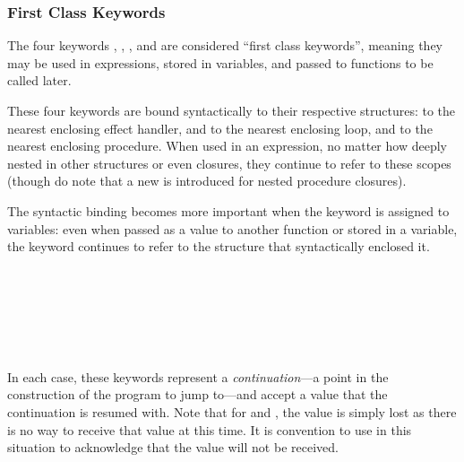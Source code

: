 \subsubsection{First Class Keywords}
\label{sec:first-class-keyword}

The four keywords , , , and  are
considered ``first class keywords'', meaning they may be used in expressions,
stored in variables, and passed to functions to be called later.

These four keywords are bound syntactically to their respective structures:
 to the nearest enclosing effect handler,  and 
to the nearest enclosing loop, and  to the nearest enclosing procedure.
When used in an expression, no matter how deeply nested in other structures or even
closures, they continue to refer to these scopes (though do note that a new 
is introduced for nested procedure closures).

The syntactic binding becomes more important when the keyword is assigned to variables:
even when passed as a value to another function or stored in a variable, the keyword
continues to refer to the structure that syntactically enclosed it.

\begin{bnf*}
     \\
     \\
     \\
     \\
     \\
\end{bnf*}

In each case, these keywords represent a \emph{continuation}---a point in the
construction of the program to jump to---and accept a value that the continuation is
resumed with. Note that for  and , the value is simply lost as
there is no way to receive that value at this time. It is convention to use 
in this situation to acknowledge that the value will not be received.

